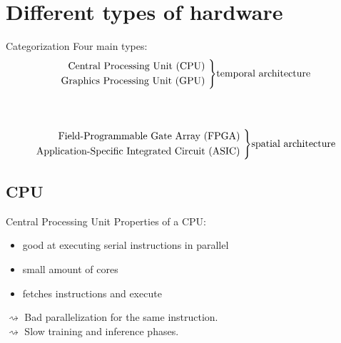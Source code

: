 \documentclass[en]{sdqbeamer}
\newenvironment{rcases}
{\left.\begin{aligned}}
	{\end{aligned}\right\rbrace}
\begin{document}
	\section{Different types of hardware}
	\begin{frame}{Categorization}
		Four main types:
		\\
		\[
		\begin{rcases}
			\text{Central Processing Unit (CPU) } \\
			\text{Graphics Processing Unit (GPU) } 
		\end{rcases} \text{temporal architecture}
		\]
		\\
		\quad
		\\
		\[
		\begin{rcases}
			\text{Field-Programmable Gate Array (FPGA) } \\
			\text{Application-Specific Integrated Circuit (ASIC) }
		\end{rcases} \text{spatial architecture}
		\]
	\end{frame}
	
	\subsection{CPU}
	\begin{frame}{Central Processing Unit}
		Properties of a CPU:
		\begin{itemize}
			\item good at executing serial instructions in parallel
			\item small amount of cores
			\item fetches instructions and execute
		\end{itemize}
		$\rightsquigarrow$ Bad parallelization for the same instruction.\\ $\rightsquigarrow$ Slow training and inference phases. \cite{capra2020updated}
	\end{frame}
	
\end{document}
